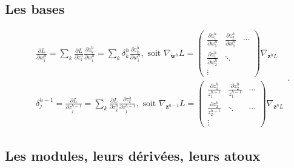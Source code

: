 \documentclass{article}
\theoremstyle{plain}%
\theoremstyle{definition}
\theoremstyle{remark}
\begin{document}
\subsection{Les bases}
\[
    \begin{aligned}
        & \frac{\partial L}{\partial w_i^h}=\sum_k \frac{\partial L}{\partial z_k^h} \frac{\partial z_k^h}{\partial w_i^h}=\sum_k \delta_k^h \frac{\partial z_k^h}{\partial w_i^h}, \text { soit } \nabla_{\mathbf{w}^h} L=\left(\begin{array}{ccc}
            \frac{\partial z_1^h}{\partial w_1^h} & \frac{\partial z_2^h}{\partial w_1^h} & \cdots \\
            \frac{\partial z_1^h}{\partial w_2^h} & \ddots & \\
            \vdots & &
        \end{array}\right) \nabla_{\mathbf{z}^h L} \\
        & \delta_j^{h-1}=\frac{\partial L}{\partial z_j^{h-1}}=\sum_k \frac{\partial L}{\partial z_k^h} \frac{\partial z_k^h}{\partial z_j^{h-1}}, \text { soit } \nabla_{\mathbf{z}^{h-1}} L=\left(\begin{array}{ccc}
        \frac{\partial z_1^h}{z_1^{h-1}} & \frac{\partial z_2^h}{z_1^{h-1}} & \cdots \\
        \frac{\partial z_2^h}{z_2^{h-1}} & \ddots & \cdots \\
        \vdots &
        \end{array}\right) \nabla_{\mathbf{z}^h L}
    \end{aligned}
.\]

\subsection{Les modules, leurs dérivées, leurs atoux}
\end{document}
